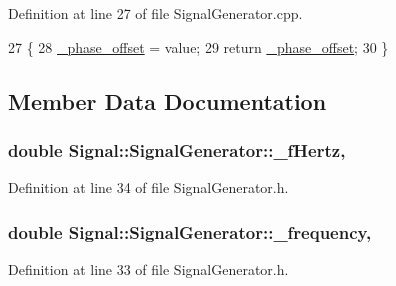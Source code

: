 Definition at line 27 of file Signal\+Generator.\+cpp.


\begin{DoxyCode}
27                                                                    \{
28     \hyperlink{classSignal_1_1SignalGenerator_a6b4444d46747c8517171edbbf4b5588f}{\_phase\_offset} = value;
29     \textcolor{keywordflow}{return} \hyperlink{classSignal_1_1SignalGenerator_a6b4444d46747c8517171edbbf4b5588f}{\_phase\_offset};
30 \}
\end{DoxyCode}


\subsection{Member Data Documentation}
\hypertarget{classSignal_1_1SignalGenerator_a85a4702347352bab1c71e0a8df8437d6}{
\subsubsection[{\+\_\+f\+Hertz}]{\setlength{\rightskip}{0pt plus 5cm}double Signal\+::\+Signal\+Generator\+::\+\_\+f\+Hertz\hspace{0.3cm}{\ttfamily [protected]}, {\ttfamily [inherited]}}}\label{classSignal_1_1SignalGenerator_a85a4702347352bab1c71e0a8df8437d6}


Definition at line 34 of file Signal\+Generator.\+h.

\hypertarget{classSignal_1_1SignalGenerator_a7f107461333bce68c5dad412db96a8c2}{
\subsubsection[{\+\_\+frequency}]{\setlength{\rightskip}{0pt plus 5cm}double Signal\+::\+Signal\+Generator\+::\+\_\+frequency\hspace{0.3cm}{\ttfamily [protected]}, {\ttfamily [inherited]}}}\label{classSignal_1_1SignalGenerator_a7f107461333bce68c5dad412db96a8c2}


Definition at line 33 of file Signal\+Generator.\+h.

